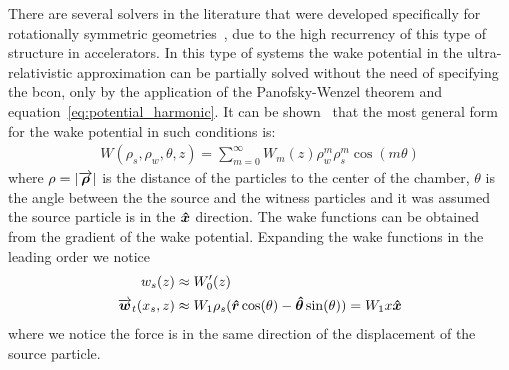     There are several solvers in the literature that were developed specifically for rotationally symmetric geometries~\cite{ABCI, MAFIA}, due to the high recurrency of this type of structure in accelerators. In this type of systems the wake potential in the ultra-relativistic approximation can be partially solved without the need of specifying the \gls{bcon}, only by the application of the Panofsky-Wenzel theorem and equation~\eqref{eq:potential_harmonic}. It can be shown~\cite{Stupakov2000a} that the most general form for the wake potential in such conditions is:
    \begin{align}
	       W(\rho_s, \rho_w, \theta, z) = \sum_{m=0}^\infty W_m(z) \rho_w^m\rho_s^m\cos(m\theta)
    \end{align}
    where $\rho = |\overrightarrow{\boldsymbol{\rho}}|$ is the distance of the particles to the center of the chamber, $\theta$ is the angle between the the source and the witness particles and it was assumed the source particle is in the $\boldsymbol{\hat x}$ direction. The wake functions can be obtained from the gradient of the wake potential. Expanding the wake functions in the leading order we notice
    \begin{align}
	    w_s(z) &\approx W'_0(z)\\
	    \overrightarrow{\boldsymbol{w}}_t(x_s, z) &\approx W_1\rho_s(\boldsymbol{\hat r}\cos(\theta)-\boldsymbol{\hat\theta}\sin(\theta)) =
						W_1x\boldsymbol{\hat x}
    \end{align}
    where we notice the force is in the same direction of the displacement of the source particle.

